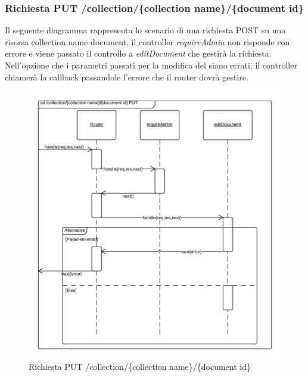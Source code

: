 \subsubsection{Richiesta PUT /collection/\{collection name\}/\{document id\}}
Il seguente diagramma rappresenta lo scenario di una richiesta POST su una risorsa collection name document, il controller \emph{requireAdmin} non risponde con errore e viene passato il controllo a \emph{editDocument} che gestirà la richiesta.
Nell'opzione che i parametri passati per la modifica del  siano errati, il controller chiamerà la callback passandole l'errore che il router dovrà gestire.
\begin{figure}[H]
	\begin{center} 
		\includegraphics[scale=0.20]{scenari/Collection Name Document PUT.png} 
		\caption{Richiesta PUT /collection/\{collection name\}/\{document id\}}
	\end{center} 
\end{figure}

\pagebreak
